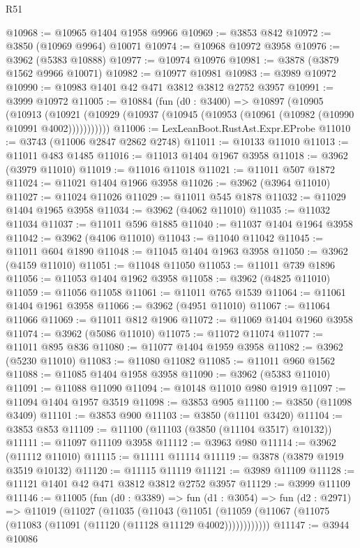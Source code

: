 \begin{lexlean}{R51}
\begin{coremodule}
@10968 := @10965 @1404 @1958 @9966
@10969 := @3853 @842
@10972 := @3850 (@10969 @9964) @10071
@10974 := @10968 @10972 @3958
@10976 := @3962 (@5383 @10888)
@10977 := @10974 @10976
@10981 := @3878 (@3879 @1562 @9966 @10071)
@10982 := @10977 @10981
@10983 := @3989 @10972
@10990 := @10983 @1401 @42 @471 @3812 @3812 @2752 @3957
@10991 := @3999 @10972
@11005 := @10884
    (fun (d0 : @3400) =>
    @10897
      (@10905
        (@10913
          (@10921 (@10929 (@10937 (@10945 (@10953 (@10961 (@10982 (@10990 @10991 @4002)))))))))))
@11006 := LexLeanBoot.RustAst.Expr.EProbe
@11010 := @3743 (@11006 @2847 @2862 @2748)
@11011 := @10133 @11010
@11013 := @11011 @483 @1485
@11016 := @11013 @1404 @1967 @3958
@11018 := @3962 (@3979 @11010)
@11019 := @11016 @11018
@11021 := @11011 @507 @1872
@11024 := @11021 @1404 @1966 @3958
@11026 := @3962 (@3964 @11010)
@11027 := @11024 @11026
@11029 := @11011 @545 @1878
@11032 := @11029 @1404 @1965 @3958
@11034 := @3962 (@4062 @11010)
@11035 := @11032 @11034
@11037 := @11011 @596 @1885
@11040 := @11037 @1404 @1964 @3958
@11042 := @3962 (@4106 @11010)
@11043 := @11040 @11042
@11045 := @11011 @604 @1890
@11048 := @11045 @1404 @1963 @3958
@11050 := @3962 (@4159 @11010)
@11051 := @11048 @11050
@11053 := @11011 @739 @1896
@11056 := @11053 @1404 @1962 @3958
@11058 := @3962 (@4825 @11010)
@11059 := @11056 @11058
@11061 := @11011 @765 @1539
@11064 := @11061 @1404 @1961 @3958
@11066 := @3962 (@4951 @11010)
@11067 := @11064 @11066
@11069 := @11011 @812 @1906
@11072 := @11069 @1404 @1960 @3958
@11074 := @3962 (@5086 @11010)
@11075 := @11072 @11074
@11077 := @11011 @895 @836
@11080 := @11077 @1404 @1959 @3958
@11082 := @3962 (@5230 @11010)
@11083 := @11080 @11082
@11085 := @11011 @960 @1562
@11088 := @11085 @1404 @1958 @3958
@11090 := @3962 (@5383 @11010)
@11091 := @11088 @11090
@11094 := @10148 @11010 @980 @1919
@11097 := @11094 @1404 @1957 @3519
@11098 := @3853 @905
@11100 := @3850 (@11098 @3409)
@11101 := @3853 @900
@11103 := @3850 (@11101 @3420)
@11104 := @3853 @853
@11109 := @11100 (@11103 (@3850 (@11104 @3517) @10132))
@11111 := @11097 @11109 @3958
@11112 := @3963 @980
@11114 := @3962 (@11112 @11010)
@11115 := @11111 @11114
@11119 := @3878 (@3879 @1919 @3519 @10132)
@11120 := @11115 @11119
@11121 := @3989 @11109
@11128 := @11121 @1401 @42 @471 @3812 @3812 @2752 @3957
@11129 := @3999 @11109
@11146 := @11005
    (fun (d0 : @3389) =>
    fun (d1 : @3054) =>
    fun (d2 : @2971) =>
    @11019
      (@11027
        (@11035
          (@11043
            (@11051 (@11059 (@11067 (@11075 (@11083 (@11091 (@11120 (@11128 @11129 @4002))))))))))))
@11147 := @3944 @10086

\end{coremodule}
\end{lexlean}
